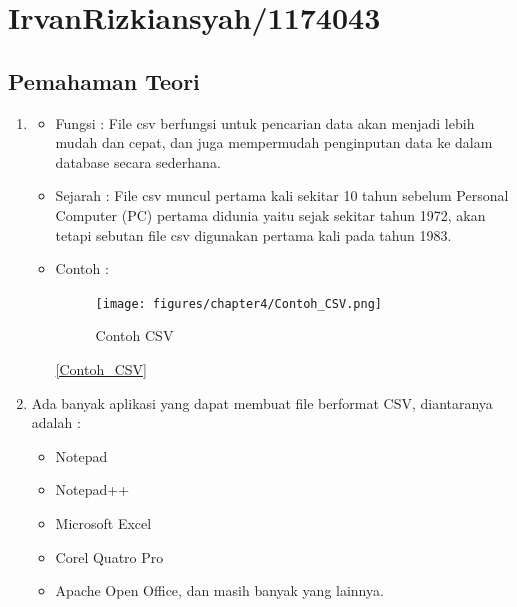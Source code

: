 
\section{IrvanRizkiansyah/1174043}
	\subsection{Pemahaman Teori}
		\begin{enumerate}
			\item \begin{itemize}
					\item Fungsi : File csv berfungsi untuk pencarian data akan menjadi lebih mudah dan cepat, dan juga mempermudah penginputan data ke dalam database secara sederhana.
					\item Sejarah : File csv muncul pertama kali sekitar 10 tahun sebelum Personal Computer (PC) pertama  didunia yaitu sejak sekitar tahun 1972, akan tetapi sebutan file csv digunakan pertama kali pada tahun 1983.
					\item Contoh : 
						\begin{figure} [ht]
							\centerline{\texttt{[image: figures/chapter4/Contoh\_CSV.png]}}
							\caption{Contoh CSV}
							\label{Contoh CSV}
						\end{figure}

					\ref{Contoh_CSV}
				\end{itemize}
			
			\item Ada banyak aplikasi yang dapat membuat file berformat CSV, diantaranya adalah :
				\begin{itemize}
					\item Notepad
					\item Notepad++
					\item Microsoft Excel
					\item Corel Quatro Pro
					\item Apache Open Office, dan masih banyak yang lainnya.
				\end{itemize}
			

\end{enumerate}
